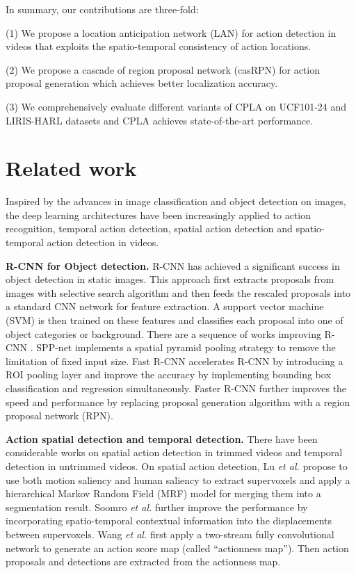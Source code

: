 \documentclass{bmvc2k}
\begin{document}
In summary, our contributions are three-fold:

(1) We propose a location anticipation network (LAN) for action detection in videos that exploits the spatio-temporal consistency of action locations.

(2) We propose a cascade of region proposal network (casRPN) for action proposal generation which achieves better localization accuracy.

(3) We comprehensively evaluate different variants of CPLA on UCF101-24 and LIRIS-HARL datasets and CPLA achieves state-of-the-art performance.

\section{Related work}

Inspired by the advances in image classification and object detection on images, the deep learning architectures have been increasingly applied to action recognition, temporal action detection, spatial action detection and spatio-temporal action detection in videos.

\textbf{R-CNN for Object detection.} R-CNN \cite{girshick14CVPR} has achieved a significant success in object detection in static images. This approach first extracts proposals from images with selective search \cite{uijlings2013selective} algorithm and then feeds the rescaled proposals into a standard CNN network for feature extraction. A support vector machine (SVM) is then trained on these features and classifies each proposal into one of object categories or background. There are a sequence of works improving R-CNN \cite{girshick14CVPR}. SPP-net \cite{he2014spatial} implements a spatial pyramid pooling strategy to remove the limitation of fixed input size. Fast R-CNN \cite{girshick2015fast} accelerates R-CNN by introducing a ROI pooling layer and improve the accuracy by implementing bounding box classification and regression simultaneously. Faster R-CNN \cite{ren2015faster} further improves the speed and performance by replacing proposal generation algorithm with a region proposal network (RPN).

\textbf{Action spatial detection and temporal detection.} There have been considerable works on spatial action detection in trimmed videos and temporal detection in untrimmed videos. On spatial action detection, Lu \textit{et al.} \cite{lu2015human} propose to use both motion saliency and human saliency to extract supervoxels and apply a hierarchical Markov Random Field (MRF) model for merging them into a segmentation result. Soomro \textit{et al.} \cite{soomro2015action} further improve the performance by incorporating spatio-temporal contextual information into the displacements between supervoxels. Wang \textit{et al.} \cite{wang2016actionness} first apply a two-stream fully convolutional network to generate an action score map (called ``actionness map''). Then action proposals and detections are extracted from the actionness map. 
\end{document}
